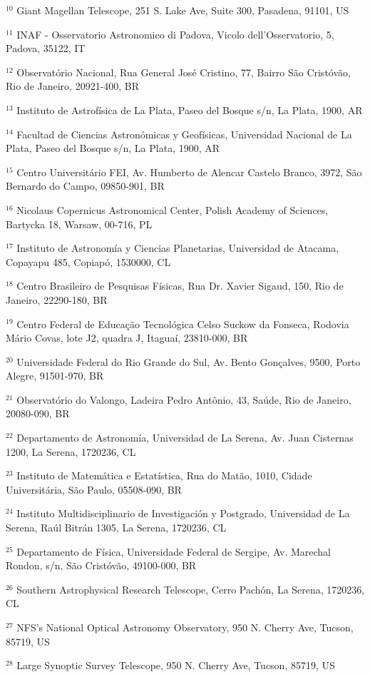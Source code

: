 \noindent
$^{10}$ Giant Magellan Telescope, 251 S. Lake Ave, Suite 300, Pasadena, 91101, US

\noindent
$^{11}$ INAF - Osservatorio Astronomico di Padova, Vicolo dell'Osservatorio, 5, Padova, 35122, IT

\noindent
$^{12}$ Observatório Nacional, Rua General José Cristino, 77, Bairro São Cristóvão, Rio de Janeiro, 20921-400, BR

\noindent
$^{13}$ Instituto de Astrofísica de La Plata, Paseo del Bosque s/n, La Plata, 1900, AR

\noindent
$^{14}$ Facultad de Ciencias Astronómicas y Geofísicas, Universidad Nacional de La Plata, Paseo del Bosque s/n, La Plata, 1900, AR

\noindent
$^{15}$ Centro Universitário FEI, Av. Humberto de Alencar Castelo Branco, 3972, São Bernardo do Campo, 09850-901, BR

\noindent
$^{16}$ Nicolaus Copernicus Astronomical Center, Polish Academy of Sciences, Bartycka 18, Warsaw, 00-716, PL

\noindent
$^{17}$ Instituto de Astronomía y Ciencias Planetarias, Universidad de Atacama, Copayapu 485, Copiapó, 1530000, CL

\noindent
$^{18}$ Centro Brasileiro de Pesquisas Físicas, Rua Dr. Xavier Sigaud, 150, Rio de Janeiro, 22290-180, BR

\noindent
$^{19}$ Centro Federal de Educação Tecnológica Celso Suckow da Fonseca, Rodovia Mário Covas, lote J2, quadra J, Itaguaí, 23810-000, BR

\noindent
$^{20}$ Universidade Federal do Rio Grande do Sul, Av. Bento Gonçalves, 9500, Porto Alegre, 91501-970, BR

\noindent
$^{21}$ Observatório do Valongo, Ladeira Pedro Antônio, 43, Saúde, Rio de Janeiro, 20080-090, BR

\noindent
$^{22}$ Departamento de Astronomía, Universidad de La Serena, Av. Juan Cisternas 1200, La Serena, 1720236, CL

\noindent
$^{23}$ Instituto de Matemática e Estatística, Rua do Matão, 1010, Cidade Universitária, São Paulo, 05508-090, BR

\noindent
$^{24}$ Instituto Multidisciplinario de Investigación y Postgrado, Universidad de La Serena, Raúl Bitrán 1305, La Serena, 1720236, CL

\noindent
$^{25}$ Departamento de Física, Universidade Federal de Sergipe, Av. Marechal Rondon, s/n, São Cristóvão, 49100-000, BR

\noindent
$^{26}$ Southern Astrophysical Research Telescope, Cerro Pachón, La Serena, 1720236, CL

\noindent
$^{27}$ NFS's National Optical Astronomy Observatory, 950 N. Cherry Ave, Tucson, 85719, US

\noindent
$^{28}$ Large Synoptic Survey Telescope, 950 N. Cherry Ave, Tucson, 85719, US
